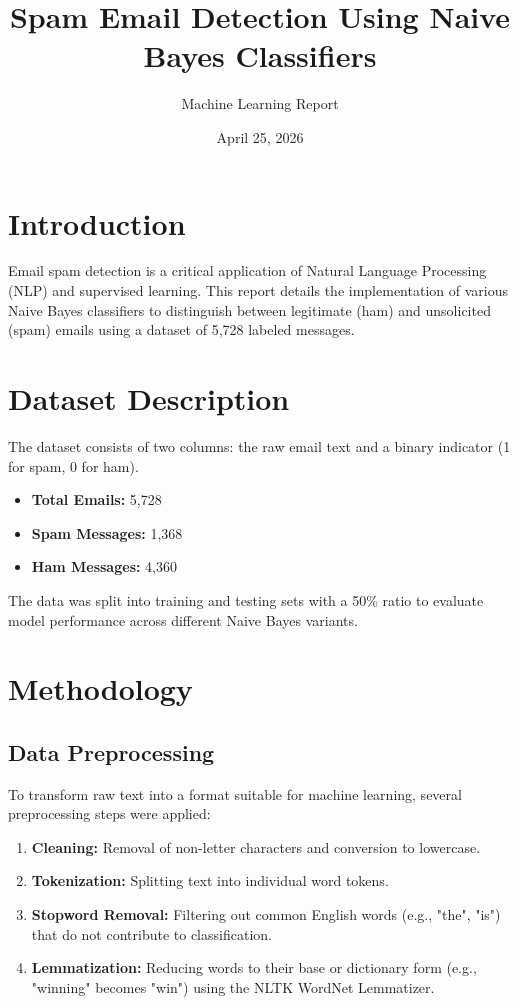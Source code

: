 \documentclass[12pt]{article}
\title{Spam Email Detection Using Naive Bayes Classifiers}
\author{Machine Learning Report}
\date{April 25, 2026}
\begin{document}
\maketitle

\section{Introduction}
Email spam detection is a critical application of Natural Language Processing (NLP) and supervised learning. This report details the implementation of various Naive Bayes classifiers to distinguish between legitimate (ham) and unsolicited (spam) emails using a dataset of 5,728 labeled messages.

\section{Dataset Description}
The dataset consists of two columns: the raw email text and a binary indicator (1 for spam, 0 for ham). 
\begin{itemize}
    \item \textbf{Total Emails:} 5,728
    \item \textbf{Spam Messages:} 1,368
    \item \textbf{Ham Messages:} 4,360
\end{itemize}
The data was split into training and testing sets with a 50\% ratio to evaluate model performance across different Naive Bayes variants.

\section{Methodology}

\subsection{Data Preprocessing}
To transform raw text into a format suitable for machine learning, several preprocessing steps were applied:
\begin{enumerate}
    \item \textbf{Cleaning:} Removal of non-letter characters and conversion to lowercase.
    \item \textbf{Tokenization:} Splitting text into individual word tokens.
    \item \textbf{Stopword Removal:} Filtering out common English words (e.g., "the", "is") that do not contribute to classification.
    \item \textbf{Lemmatization:} Reducing words to their base or dictionary form (e.g., "winning" becomes "win") using the NLTK WordNet Lemmatizer.
\end{enumerate}
\end{document}
